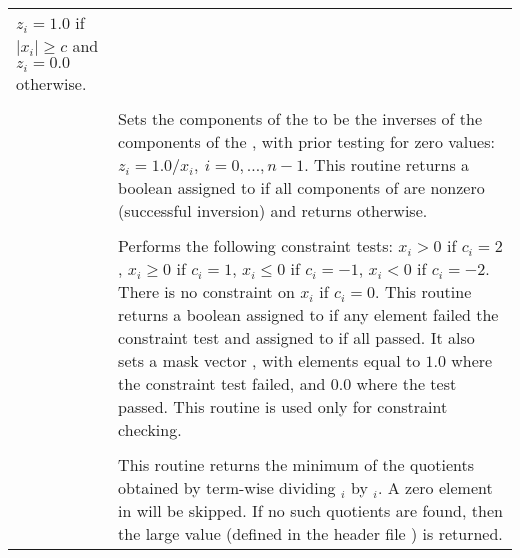 \begin{xtabular}{|p{\colone}|p{\coltwo}|}
$z_i = 1.0$ if $| x_i | \ge c$ and $z_i = 0.0$ otherwise.
\\[2mm]
 &  \\
& Sets the components of the   to be the inverses
of the components of the  , with prior testing
for zero values:
$z_i = 1.0 /  x_i  , \: i=0,\ldots,n-1$.
This routine returns a boolean assigned to  if all 
components of  are
nonzero (successful inversion) and returns  otherwise.  
\\[2mm]
 &  \\
& Performs the following constraint tests:
$x_i > 0$ if $c_i=2$,
$x_i \ge 0$ if $c_i=1$,
$x_i \le 0$ if $c_i=-1$,
$x_i < 0$ if $c_i=-2$.
There is no constraint on $x_i$ if $c_i=0$.
This routine returns a boolean assigned to  if any element failed
the constraint test and assigned to  if all passed.  It also sets a
mask vector , with elements equal to $1.0$ where the constraint 
test failed, and $0.0$ where the test passed.
This routine is used only for constraint checking.
\\[2mm]
 &  \\
& This routine returns the minimum of the quotients obtained   
by term-wise dividing $_i$ by $_i$. 
A zero element in  will be skipped. 
If no such quotients are found, then the large value 
 (defined in the header file )
is returned. 
\\
\end{xtabular}
\bigskip


\newlength{\coloneb}
\newlength{\coltwob}
\setlength{\coltwob}{\textwidth}
\addtolength{\coltwob}{-0.4in}
\addtolength{\coltwob}{-\coloneb}

